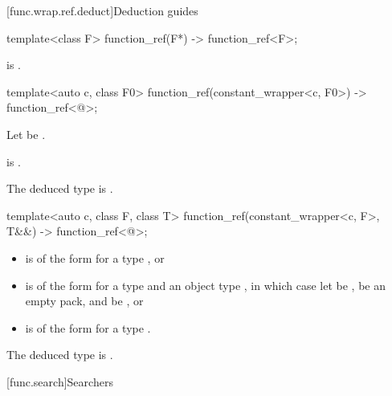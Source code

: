 [func.wrap.ref.deduct]{Deduction guides}

\begin{itemdecl}
template<class F>
  function_ref(F*) -> function_ref<F>;
\end{itemdecl}

\begin{itemdescr}
\pnum
\constraints
{} is .
\end{itemdescr}

\begin{itemdecl}
template<auto c, class F0>
  function_ref(constant_wrapper<c, F0>) -> function_ref<@\seebelow@>;
\end{itemdecl}

\begin{itemdescr}
\pnum
Let  be .

\pnum
\constraints
{} is .

\pnum
\remarks
The deduced type is .
\end{itemdescr}

\begin{itemdecl}
template<auto c, class F, class T>
  function_ref(constant_wrapper<c, F>, T&&) -> function_ref<@\seebelow@>;
\end{itemdecl}

\begin{itemdescr}
\pnum
\constraints
\begin{itemize}
\item
{} is of the form
 for a type , or
\item
{} is of the form
 for a type  and an object type ,
in which case
let  be ,
 be an empty pack, and
 be , or
\item
{} is of the form
 for a type .
\end{itemize}

\pnum
\remarks
The deduced type is .
\end{itemdescr}

[func.search]{Searchers}

